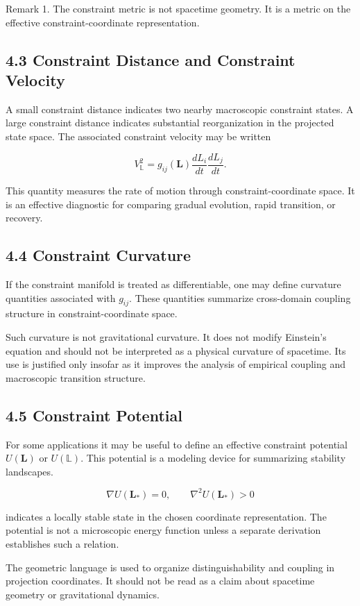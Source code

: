 Remark 1. The constraint metric is not spacetime geometry. It is a metric on the effective constraint-coordinate representation.

\subsection{4.3 Constraint Distance and Constraint Velocity}

A small constraint distance indicates two nearby macroscopic constraint states. A large constraint distance indicates substantial reorganization in the projected state space. The associated constraint velocity may be written

\[ V_{\mathbb{L}}^2=g_{ij}(\mathbf{L})\frac{dL_i}{dt}\frac{dL_j}{dt}. \]

This quantity measures the rate of motion through constraint-coordinate space. It is an effective diagnostic for comparing gradual evolution, rapid transition, or recovery.

\subsection{4.4 Constraint Curvature}

If the constraint manifold is treated as differentiable, one may define curvature quantities associated with \(g_{ij}\). These quantities summarize cross-domain coupling structure in constraint-coordinate space.

Such curvature is not gravitational curvature. It does not modify Einstein's equation and should not be interpreted as a physical curvature of spacetime. Its use is justified only insofar as it improves the analysis of empirical coupling and macroscopic transition structure.

\subsection{4.5 Constraint Potential}

For some applications it may be useful to define an effective constraint potential \(U(\mathbf{L})\) or \(U(\mathbb{L})\). This potential is a modeling device for summarizing stability landscapes.

\[ \nabla U(\mathbf{L}_*)=0, \qquad \nabla^2 U(\mathbf{L}_*)>0 \]

indicates a locally stable state in the chosen coordinate representation. The potential is not a microscopic energy function unless a separate derivation establishes such a relation.

The geometric language is used to organize distinguishability and coupling in projection coordinates. It should not be read as a claim about spacetime geometry or gravitational dynamics.


